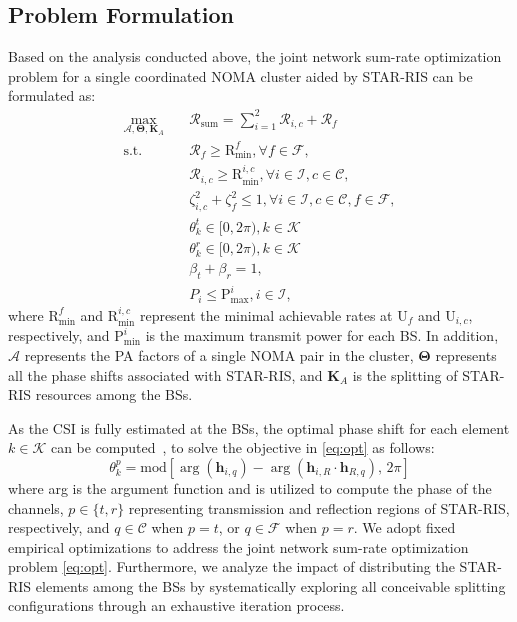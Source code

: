 \documentclass[conference]{IEEEtran}
\begin{document}

\subsection{Problem Formulation}
Based on the analysis conducted above, the joint network sum-rate optimization problem for a single coordinated NOMA cluster aided by STAR-RIS can be formulated as:
\begin{align}
\max_{\mathbf{\mathcal{A}}, \mathbf{\Theta}, \textbf{K}_A} \quad & \mathcal{R}_{\text{sum}}=\sum_{i=1}^{2} \mathcal{R}_{i,c} + \mathcal{R}_{f} \label{eq:opt} \\
\textrm{s.t.} \quad & \mathcal{R}_f\geq\text{R}_\text{min}^f, \forall f \in \mathcal{F}, \nonumber \\
    \quad & \mathcal{R}_{i, c}\geq\text{R}_\text{min}^{i,c}, \forall i \in \mathcal{I}, c \in \mathcal{C}, \nonumber \\
    \quad & \zeta_{i,c}^2 + \zeta_f^2\leq1, \forall i \in \mathcal{I}, c \in \mathcal{C}, f \in \mathcal{F}, \nonumber \\
    \quad & \theta_k^t\in[0, 2\pi), k \in \mathcal{K} \nonumber \\
    \quad & \theta_k^r\in[0, 2\pi), k \in \mathcal{K} \nonumber \\
    \quad & \beta_t + \beta_r = 1, \nonumber \\
    \quad & P_i \leq \text{P}_\text{max}^i, i \in \mathcal{I}, \nonumber
\end{align}
where $\text{R}_\text{min}^f$ and $\text{R}_\text{min}^{i,c}$ represent the minimal achievable rates at U$_f$ and U$_{i,c}$, respectively, and $\text{P}_\text{min}^i$ is the maximum transmit power for each BS. In addition, $\mathbf{\mathcal{A}}$ represents the PA factors of a single NOMA pair in the cluster, $\mathbf{\Theta}$ represents all the phase shifts associated with STAR-RIS, and $\textbf{K}_A$ is the splitting of STAR-RIS resources among the BSs.

As the CSI is fully estimated at the BSs, the optimal phase shift for each element $k \in \mathcal{K}$ can be computed~\cite{wu2019intelligent}, to solve the objective in \ref{eq:opt} as follows:
\begin{equation}
    \theta_k^p = \text{mod}[\arg(\textbf{h}_{i,q}) - \arg(\textbf{h}_{i,R}\cdot \textbf{h}_{R, q}),\,2\pi]
\end{equation}
where arg is the argument function and is utilized to compute the phase of the channels, $p \in \{t, r\}$ representing transmission and reflection regions of STAR-RIS, respectively, and $q \in \mathcal{C}$ when $p=t$, or $q \in \mathcal{F}$ when $p=r$. We adopt fixed empirical optimizations to address the joint network sum-rate optimization problem \ref{eq:opt}. Furthermore, we analyze the impact of distributing the STAR-RIS elements among the BSs by systematically exploring all conceivable splitting configurations through an exhaustive iteration process.
\end{document}
